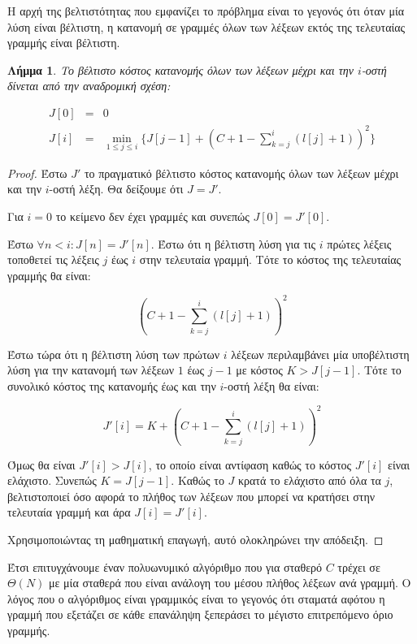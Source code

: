 \documentclass[11pt,a4paper]{book}
\newtheorem*{lemma}{Λήμμα}
\begin{document}
Η αρχή της βελτιστότητας που εμφανίζει το πρόβλημα είναι το γεγονός ότι όταν μία λύση είναι βέλτιστη, η κατανομή σε γραμμές όλων των λέξεων εκτός της τελευταίας γραμμής είναι βέλτιστη.

\begin{lemma}
Το βέλτιστο κόστος κατανομής όλων των λέξεων μέχρι και την $i$-οστή δίνεται από την αναδρομική σχέση:

\begin{align*}
J[ 0 ] &=& 0 \\
J[ i ] &=& \min_{1 \leq j \leq i}\{ J[ j - 1 ] + ( C + 1 - \sum_{k=j}^i(l[j] + 1) )^2 \}
\end{align*}
\end{lemma}
\begin{proof}
Έστω $J'$ το πραγματικό βέλτιστο κόστος κατανομής όλων των λέξεων μέχρι και την $i$-οστή λέξη. Θα δείξουμε ότι $J = J'$.

Για $i = 0$ το κείμενο δεν έχει γραμμές και συνεπώς $J[ 0 ] = J'[ 0 ]$.

Έστω $\forall n < i: J[ n ] = J'[ n ]$. Έστω ότι η βέλτιστη λύση για τις $i$ πρώτες λέξεις τοποθετεί τις λέξεις $j$ έως $i$ στην τελευταία γραμμή. Τότε το κόστος της τελευταίας γραμμής θα είναι:

\[
( C + 1 - \sum_{k=j}^i(l[j] + 1) )^2
\]

Έστω τώρα ότι η βέλτιστη λύση των πρώτων $i$ λέξεων περιλαμβάνει μία υποβέλτιστη λύση για την κατανομή των λέξεων $1$ έως $j - 1$ με κόστος $K > J[ j - 1 ]$. Τότε το συνολικό κόστος της κατανομής έως και την $i$-οστή λέξη θα είναι:

\[
J'[ i ] = K + ( C + 1 - \sum_{k=j}^i(l[j] + 1) )^2
\]

Όμως θα είναι $J'[ i ] > J[ i ]$, το οποίο είναι αντίφαση καθώς το κόστος $J'[ i ]$ είναι ελάχιστο. Συνεπώς $K = J[ j - 1 ]$. Καθώς το $J$ κρατά το ελάχιστο από όλα τα $j$, βελτιστοποιεί όσο αφορά το πλήθος των λέξεων που μπορεί να κρατήσει στην τελευταία γραμμή και άρα $J[ i ] = J'[ i ]$.

Χρησιμοποιώντας τη μαθηματική επαγωγή, αυτό ολοκληρώνει την απόδειξη.
\end{proof}

Έτσι επιτυγχάνουμε έναν πολυωνυμικό αλγόριθμο που για σταθερό $C$ τρέχει σε $\Theta( N )$ με μία σταθερά που είναι ανάλογη του μέσου πλήθος λέξεων ανά γραμμή. Ο λόγος που ο αλγόριθμος είναι γραμμικός είναι το γεγονός ότι σταματά αφότου η γραμμή που εξετάζει σε κάθε επανάληψη ξεπεράσει το μέγιστο επιτρεπόμενο όριο γραμμής.
\end{document}
